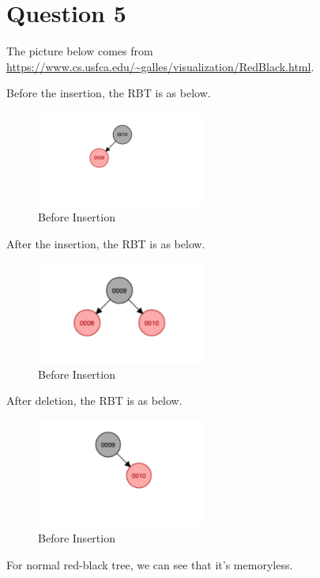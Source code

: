 \documentclass[11pt]{article}
\begin{document}
\section{Question 5}
The picture below comes from \url{https://www.cs.usfca.edu/~galles/visualization/RedBlack.html}.

Before the insertion, the RBT is as below.
\newpage
 \begin{figure}[hbt!]
  \centering
    \includegraphics[width=0.5\textwidth]{Figures/q5_1.png}
  \caption{Before Insertion}
\end{figure}



After the insertion, the RBT is as below.
 \begin{figure}[hbt!]
  \centering
    \includegraphics[width=0.5\textwidth]{Figures/q5_2.png}
  \caption{Before Insertion}
\end{figure}

After deletion, the RBT is as below.
 \begin{figure}[hbt!]
  \centering
    \includegraphics[width=0.5\textwidth]{Figures/q5_3.png}
  \caption{Before Insertion}
\end{figure}


For normal red-black tree, we can see that it's memoryless.
\end{document}

